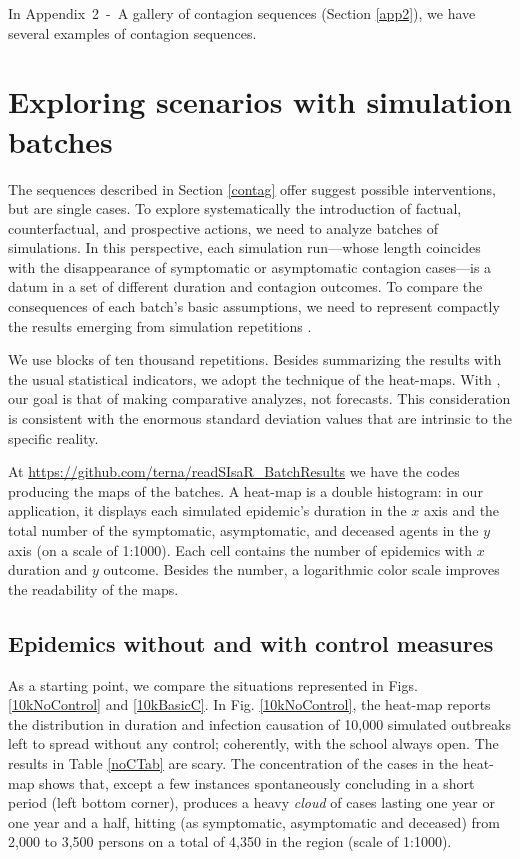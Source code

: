 \documentclass[graybox]{svmult}
\begin{document}
In Appendix~2~-~A gallery of contagion sequences (Section \ref{app2}), we have several examples of contagion sequences.

\section{Exploring scenarios with simulation batches}
\label{exploring}

The sequences described in Section \ref{contag} offer suggest possible interventions, but are single cases. To explore systematically the introduction of factual, counterfactual, and prospective actions, we need to analyze batches of simulations. In this perspective, each simulation run---whose length coincides with the disappearance of symptomatic or asymptomatic contagion cases---is a datum in a set of different duration and contagion outcomes. To compare the consequences of each batch's basic assumptions, we need to represent compactly the results emerging from simulation repetitions . 

We use blocks of ten thousand repetitions. Besides summarizing the results with the usual statistical indicators, we adopt the technique of the heat-maps. With \cite{steinmann2020don}, our goal is that of making comparative analyzes, not forecasts. This consideration is consistent with the enormous standard deviation values that are intrinsic to the specific reality. 

At \href{https://github.com/terna/readSIsaR\_BatchResults}{https://github.com/terna/readSIsaR\_BatchResults} we have the codes producing the maps of the batches. A heat-map is a double histogram: in our application, it displays each simulated epidemic's duration in the $x$ axis and the total number of the symptomatic, asymptomatic, and deceased agents in the $y$ axis (on a scale of 1:1000). Each cell contains the number of epidemics with $x$ duration and $y$ outcome. Besides the number, a logarithmic color scale improves the readability of the maps.

\subsection{Epidemics without and with control measures}
\label{withoutWith}

As a starting point, we compare the situations represented in Figs. \ref{10kNoControl} and \ref{10kBasicC}. In Fig. \ref{10kNoControl}, the heat-map reports the distribution in duration and infection causation of 10,000 simulated outbreaks left to spread without any control; coherently, with the school always open. 
The results in Table \ref{noCTab} are scary. The concentration of the cases in the heat-map shows that, except a few instances spontaneously concluding in a short period (left bottom corner), produces a heavy \emph{cloud} of cases lasting one year or one year and a half, hitting (as symptomatic, asymptomatic and deceased) from 2,000 to 3,500 persons on a total of 4,350 in the region (scale of 1:1000).
\end{document}
